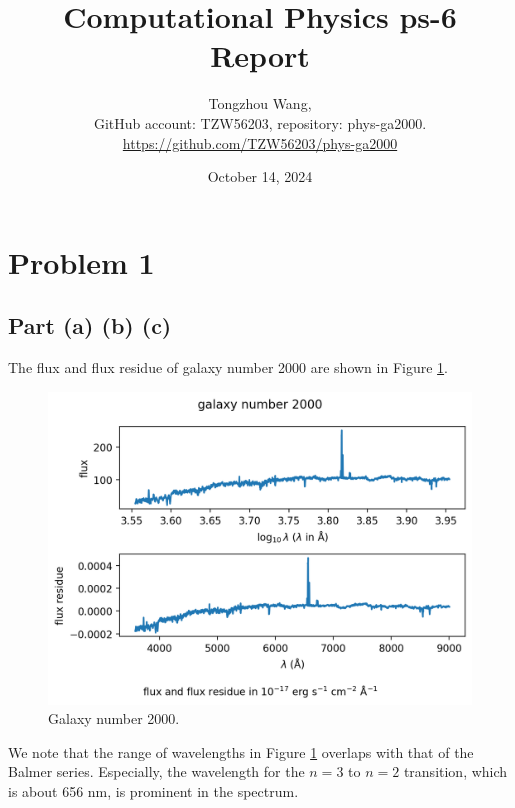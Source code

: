 \documentclass[11pt]{article}
\title{Computational Physics ps-6 Report}
\author{Tongzhou Wang, \\ GitHub account: TZW56203, repository: phys-ga2000. \\ \url{https://github.com/TZW56203/phys-ga2000}}
\date{October 14, 2024}
\begin{document}
\maketitle

\section{Problem 1}

\subsection{Part (a) (b) (c)}
The flux and flux residue of galaxy number 2000 are shown in Figure \ref{fig:Galaxy}.
\begin{figure}[H]
    \centering
    \includegraphics[scale = 0.8]{images/ps6-1abc.png}
    \caption{Galaxy number 2000.}
    \label{fig:Galaxy}
\end{figure}

We note that the range of wavelengths in Figure \ref{fig:Galaxy} overlaps with that of the Balmer series. Especially, the wavelength for the $n=3$ to $n=2$ transition, which is about 656 nm, is prominent in the spectrum.
\end{document}
